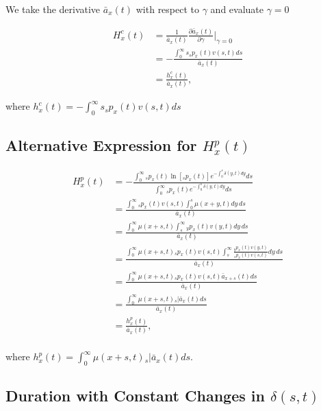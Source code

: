 \documentclass[12pt]{article}
\begin{document}
We take the derivative $\bar{a}_{x}(t)$ with respect to $\gamma$ and evaluate $\gamma=0$


\begin{equation}\label{eq:EntropyConst3}
\begin{split}
{H}^{c}_x(t)&=\frac{1}{\bar{a}_x(t)}\frac{\partial \bar{a}_x(t)}{\partial \gamma} \bigg\rvert_{\gamma=0}\\
&= -\frac{\int_0^\infty s {}_sp_x(t) {v}(s,t)ds}{\bar{a}_x(t)} \\
&= \frac{{h}^{c}_x(t)}{\bar{a}_x(t)},
\end{split}
\end{equation}

where ${h}^{c}_x(t)=-\int_0^\infty s {}_sp_x(t) {v}(s,t)ds$



\subsection{Alternative Expression for ${H}^{p}_{x}(t)$}\label{sec:EntropyAlt}

\begin{equation} \label{eq:EntropyAnnuityA1}
\begin{split}
{H}^{p}_{x}(t) &= -\frac{ \int_{0}^{\infty}{}_sp_x(t)\ln[{}_sp_x(t)] e^{-\int_{0}^{s}\delta(y,t)dy} ds}{\int_0^\infty {}_sp_x(t) e^{-\int_{0}^{s}\delta(y,t)dy} ds}\\
&= \frac{\int_0^\infty {}_sp_x(t) {v}(s,t) \int_0^s \mu(x+y,t) dy\,ds}{\bar{a}_x(t)}\\
&= \frac{\int_0^\infty  \mu(x+s,t) \int_s^\infty {}_yp_x(t) {v}(y,t)  dy\,ds}{\bar{a}_x(t)}\\
&= \frac{\int_0^\infty  \mu(x+s,t)  {}_sp_x(t) {v}(s,t) \int_s^\infty \frac{ {}_yp_x(t) {v}(y,t)}{ {}_sp_x(t) {v}(s,t)}  dy\,ds}{\bar{a}_x(t)}\\
&=  \frac{\int_0^\infty \mu(x+s,t)   {}_sp_x(t) {v}(s,t) \bar{a}_{x+s}(t) ds}{\bar{a}_x(t)} \\
&=  \frac{\int_0^\infty \mu(x+s,t)  {}_s|\bar{a}_x(t) ds}{\bar{a}_x(t)} \\
&=  \frac{{h}^{p}_{x}(t)}{\bar{a}_x(t)}, \\
\end{split}
\end{equation}

where ${h}^{p}_{x}(t)=\int_0^\infty \mu(x+s,t)   {}_s|\bar{a}_x(t) ds$.



\subsection{Duration with Constant Changes in $\delta(s,t)$}\label{sec:DurConst}
\end{document}

